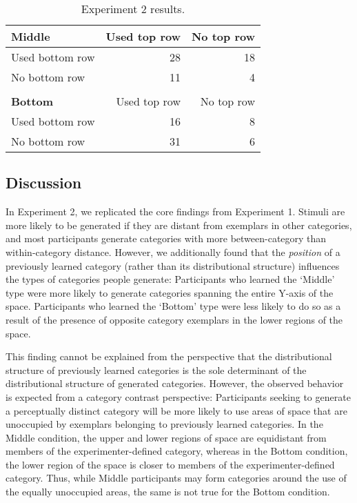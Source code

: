 \documentclass[12pt]{article}
\begin{document}
\begin{flushleft}
\begin{table}
\begin{center} 
\caption{Experiment 2 results.} 
\label{table:e2-subset-table} 
\vskip 0.12in
\begin{tabular}{ l r r}
    \textbf{Middle}         & Used top row & No top row \\
    \hline
    Used bottom row       &  28 & 18  \\
    No bottom row          &  11 &  4  \\
    \\
    \textbf{Bottom}         & Used top row & No top row \\
    \hline
    Used bottom row        & 16 & 8 \\
    No bottom row          & 31 & 6 \\
\end{tabular}
\end{center} 
\end{table}

\subsection{Discussion}

In Experiment 2, we replicated the core findings from Experiment 1. Stimuli are more likely to be generated if they are distant from exemplars in other categories, and most participants generate categories with more between-category than within-category distance. However, we additionally found that the {\em position} of a previously learned category (rather than its distributional structure) influences the types of categories people generate: Participants who learned the `Middle' type were more likely to generate categories spanning the entire Y-axis of the space. Participants who learned the `Bottom' type were less likely to do so as a result of the presence of opposite category exemplars in the lower regions of the space.

This finding cannot be explained from the perspective that the distributional structure of previously learned categories is the sole determinant of the distributional structure of generated categories. However, the observed behavior is expected from a category contrast perspective: Participants seeking to generate a perceptually distinct category will be more likely to use areas of space that are unoccupied by exemplars belonging to previously learned categories. In the Middle condition, the upper and lower regions of space are equidistant from members of the experimenter-defined category, whereas in the Bottom condition, the lower region of the space is closer to members of the experimenter-defined category. Thus, while Middle participants may form categories around the use of the equally unoccupied areas, the same is not true for the Bottom condition.


\end{flushleft}
\end{document}
